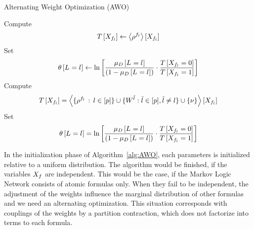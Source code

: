 \begin{algorithm}[hbt!]
\caption{Alternating Weight Optimization (AWO)}\label{alg:AWO}
\begin{algorithmic}
\For{$\selindexin$}
	\State Compute
		\[ T\left[X_{f_{l}}\right]
		\leftarrow \left\langle \rho^{f_{l}}\right\rangle \left[ X_{f_{l}} \right] \]
	\State Set 
		\begin{align*}
	 		\theta\left[L_{}=l_{}\right] 
			\leftarrow \ln \left[ 
			\frac{\mu_{D}\left[L_{}=l_{}\right]}{(1-\mu_{D}\left[L_{}=l_{}\right])} 
			\cdot \frac{T\left[X_{f_{l}}=0\right]}{T\left[X_{f_{l}}=1\right]} 
			 \right] 
		\end{align*}
\EndFor
{}
\For{$\selindexin$}
	\State Compute
	\begin{align*}
	 	T\left[X_{f_{l}}\right] 
		= \left\langle \{\rho^{f_{l}} \, : \, l\in[p]\}
		\cup\{W^{\tilde{l}} : \tilde{l} \in [p], \tilde{l}\neq l\}
		\cup\{\nu\}\right\rangle \left[ X_{f_{l}} \right]
	\end{align*}
	\State Set 
	\begin{align*}
	 	\theta\left[L_{}=l_{}\right] = \ln \left[ 
		\frac{\mu_{D}\left[L_{}=l_{}\right]}{(1-\mu_{D}\left[L_{}=l_{}\right])} 
		\cdot \frac{T\left[X_{f_{l}}=0\right]}{T\left[X_{f_{l}}=1\right]} 
		 \right] 
	\end{align*}
\EndFor
\EndWhile
\end{algorithmic}
\end{algorithm}


In the initialization phase of Algorithm~\ref{alg:AWO}, each parameters is initialized relative to a uniform distribution. 
The algorithm would be finished, if the variables $X_{f}$ are independent.
This would be the case, if the Markov Logic Network consists of atomic formulas only.
When they fail to be independent, the adjustment of the weights influence the marginal distribution of other formulas and we need an alternating optimization.
% 
This situation corresponds with couplings of the weights by a partition contraction, which does not factorize into terms to each formula.


